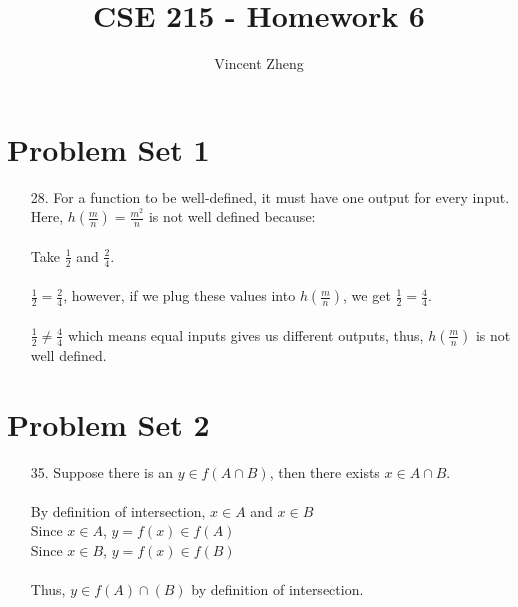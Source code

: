 \documentclass[12pt]{article}
\author{Vincent Zheng}
\begin{document}
\title{CSE 215 - Homework 6}
\maketitle

\section*{Problem Set 1}
\begin{itemize}
    \item [28.]
        For a function to be well-defined, it must have one output for every input.
        Here, $h(\frac{m}{n}) = \frac{m^2}{n}$ is not well defined because: \\
        \\
        Take $\frac{1}{2}$ and $\frac{2}{4}$.\\
        \\
        $\frac{1}{2} = \frac{2}{4}$, however, if we plug these values into
        $h(\frac{m}{n})$, we get $\frac{1}{2} = \frac{4}{4}$.\\
        \\
        $\frac{1}{2} \neq \frac{4}{4}$ which means equal inputs gives us different outputs,
        thus, $h(\frac{m}{n})$ is not well defined.

\end{itemize}

\section*{Problem Set 2}
\begin{itemize}
    \item [35.]
        Suppose there is an $y \in f(A \cap B)$, then there exists $x \in A \cap B$. \\
        \\
        By definition of intersection, $x \in A$ and $x \in B$ \\
        Since $x \in A$, $y = f(x) \in f(A)$ \\
        Since $x \in B$, $y = f(x) \in f(B)$ \\
        \\
        Thus, $y \in f(A) \cap (B)$ by definition of intersection.

\end{itemize}

\newpage
\end{document}
